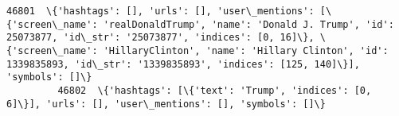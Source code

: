 \documentclass[11pt]{article}
\begin{document}
\begin{Verbatim}[commandchars=\\\{\}]
         46801  \{'hashtags': [], 'urls': [], 'user\_mentions': [\{'screen\_name': 'realDonaldTrump', 'name': 'Donald J. Trump', 'id': 25073877, 'id\_str': '25073877', 'indices': [0, 16]\}, \{'screen\_name': 'HillaryClinton', 'name': 'Hillary Clinton', 'id': 1339835893, 'id\_str': '1339835893', 'indices': [125, 140]\}], 'symbols': []\}                                                                                                                                                                                                                                                                                                                                                                                                                                                                                                                                                                                                                                                                                                                                                                                                                                                                                         
         46802  \{'hashtags': [\{'text': 'Trump', 'indices': [0, 6]\}], 'urls': [], 'user\_mentions': [], 'symbols': []\}                                                                                                                                                                                                                                                                                                                                                                                                                                                                                                                                                                                                                                                                                                                                                                                                                                                                                                                                                                                                                                                                                                           

\end{Verbatim}
\end{document}
